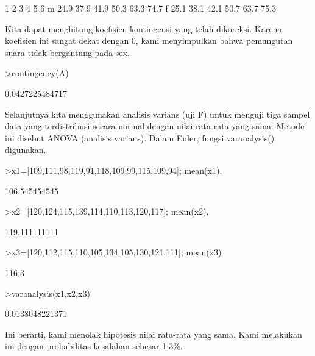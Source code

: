 \documentclass[a4paper,10pt]{article}
\begin{document}
\begin{eulernotebook}
\begin{eulerprompt}
\end{eulerprompt}
\begin{euleroutput}
             1     2     3     4     5     6
       m  24.9  37.9  41.9  50.3  63.3  74.7
       f  25.1  38.1  42.1  50.7  63.7  75.3
\end{euleroutput}
\begin{eulercomment}
Kita dapat menghitung koefisien kontingensi yang telah dikoreksi.
Karena koefisien ini sangat dekat dengan 0, kami menyimpulkan bahwa
pemungutan suara tidak bergantung pada sex.
\end{eulercomment}
\begin{eulerprompt}
>contingency(A)
\end{eulerprompt}
\begin{euleroutput}
  0.0427225484717
\end{euleroutput}
\begin{eulercomment}
\begin{eulercomment}
\begin{eulercomment}
Selanjutnya kita menggunakan analisis varians (uji F) untuk menguji
tiga sampel data yang terdistribusi secara normal dengan nilai
rata-rata yang sama. Metode ini disebut ANOVA (analisis varians).
Dalam Euler, fungsi varanalysis() digunakan.
\end{eulercomment}
\begin{eulerprompt}
>x1=[109,111,98,119,91,118,109,99,115,109,94]; mean(x1),
\end{eulerprompt}
\begin{euleroutput}
  106.545454545
\end{euleroutput}
\begin{eulerprompt}
>x2=[120,124,115,139,114,110,113,120,117]; mean(x2),
\end{eulerprompt}
\begin{euleroutput}
  119.111111111
\end{euleroutput}
\begin{eulerprompt}
>x3=[120,112,115,110,105,134,105,130,121,111]; mean(x3)
\end{eulerprompt}
\begin{euleroutput}
  116.3
\end{euleroutput}
\begin{eulerprompt}
>varanalysis(x1,x2,x3)
\end{eulerprompt}
\begin{euleroutput}
  0.0138048221371
\end{euleroutput}
\begin{eulercomment}
Ini berarti, kami menolak hipotesis nilai rata-rata yang sama. Kami
melakukan ini dengan probabilitas kesalahan sebesar 1,3\%.


\end{eulercomment}
\end{eulercomment}
\end{eulercomment}
\end{eulernotebook}
\end{document}
